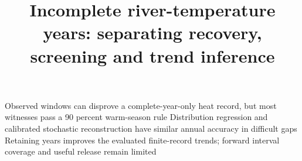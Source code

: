 \documentclass[draft,linenumbers]{agujournal2025}
\begin{document}
\title{Incomplete river-temperature years: separating recovery, screening and trend inference}
\keypoints
{Observed windows can disprove a complete-year-only heat record, but most witnesses pass a 90 percent warm-season rule}
{Distribution regression and calibrated stochastic reconstruction have similar annual accuracy in difficult gaps}
{Retaining years improves the evaluated finite-record trends; forward interval coverage and useful release remain limited}
\maketitle\par
\end{document}
